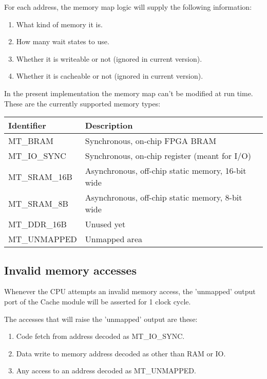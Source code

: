     For each address, the memory map logic will supply the following information:

\begin{enumerate}
    \item What kind of memory it is.
    \item How many wait states to use.
    \item Whether it is writeable or not (ignored in current version).
    \item Whether it is cacheable or not (ignored in current version).
\end{enumerate}
        
    In the present implementation the memory map can't be modified at run time.\\
    
    These are the currently supported memory types:
    
\begin{tabular}{ll}
\hline
Identifier & Description \\
\hline
MT\_BRAM            & Synchronous, on-chip FPGA BRAM\\
MT\_IO\_SYNC        & Synchronous, on-chip register (meant for I/O)\\
MT\_SRAM\_16B       & Asynchronous, off-chip static memory, 16-bit wide\\
MT\_SRAM\_8B        & Asynchronous, off-chip static memory, 8-bit wide\\
MT\_DDR\_16B        & Unused yet\\
MT\_UNMAPPED        & Unmapped area\\
\hline
\end{tabular}
   
\subsection{Invalid memory accesses}
\label{invalid_memory}

    Whenever the CPU attempts an invalid memory access, the 'unmapped' output 
    port of the Cache module will be asserted for 1 clock cycle.
    
    The accesses that will raise the 'unmapped' output are these:
    
    \begin{enumerate}
    \item Code fetch from address decoded as MT\_IO\_SYNC.
    \item Data write to memory address decoded as other than RAM or IO.
    \item Any access to an address decoded as MT\_UNMAPPED.
    \end{enumerate}
    
